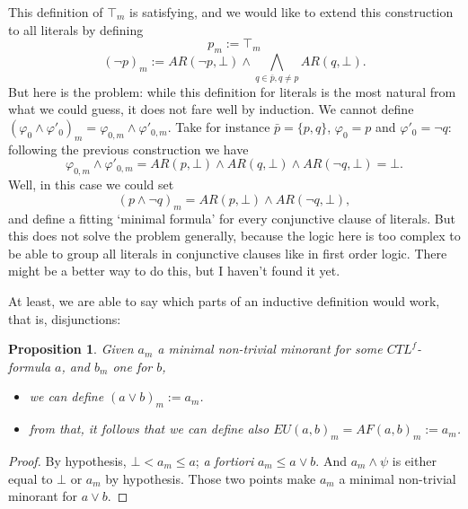 \documentclass[10pt]{article}
\newcommand{\ARp}{{AR(p,\bot)}}
\newtheorem{proposition}[definition]{Proposition}
\begin{document}
This definition of $\top_m$ is satisfying, and we would like to extend this construction to all literals by defining \[p_m:=\top_m\] \[(\neg p)_m:=AR(\neg p,\bot)\wedge\bigwedge_{q\in\bar{p},q\not=p}AR(q,\bot).\] But here is the problem: while this definition for literals is the most natural from what we could guess, it does not fare well by induction. We cannot define $(\varphi_0\wedge\varphi'_0)_m=\varphi_{0,m}\wedge\varphi'_{0,m}$. Take for instance $\bar{p}=\{p,q\}$, $\varphi_0=p$ and $\varphi'_0=\neg q$: following the previous construction we have \[\varphi_{0,m}\wedge\varphi'_{0,m}=AR(p,\bot)\wedge AR(q,\bot)\wedge AR(\neg q,\bot)=\bot.\]
Well, in this case we could set \[(p\wedge\neg q)_m = \ARp\wedge AR(\neg q,\bot),\] and define a fitting `minimal formula' for every conjunctive clause of literals. But this does not solve the problem generally, because the logic here is too complex to be able to group all literals in conjunctive clauses like in first order logic. There might be a better way to do this, but I haven't found it yet.

At least, we are able to say which parts of an inductive definition would work, that is, disjunctions:
\begin{proposition}
    Given $a_m$ a minimal non-trivial minorant for some $CTL^f$-formula $a$, and $b_m$ one for $b$,
    \begin{itemize}
    \item[-] we can define $(a\vee b)_m:=a_m$.
    \item[-] from that, it follows that we can define also $EU(a,b)_m=AF(a,b)_m := a_m$.
    \end{itemize}
\end{proposition}
\begin{proof}
    By hypothesis, $\bot< a_m\leq a$; \emph{a fortiori} $a_m\leq a\vee b$. And $a_m\wedge\psi$ is either equal to $\bot$ or $a_m$ by hypothesis. Those two points make $a_m$ a minimal non-trivial minorant for $a\vee b$.
\end{proof}
\end{document}
